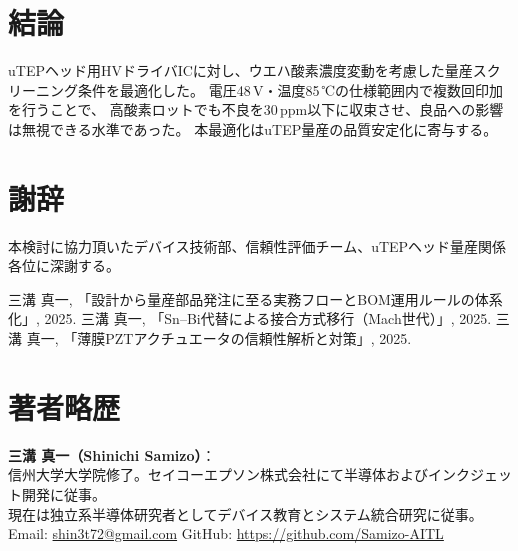 \documentclass[twocolumn]{ieeetran}
\begin{document}
\section{結論}
uTEPヘッド用HVドライバICに対し、ウエハ酸素濃度変動を考慮した量産スクリーニング条件を最適化した。
電圧48\,V・温度85\,℃の仕様範囲内で複数回印加を行うことで、
高酸素ロットでも不良を30\,ppm以下に収束させ、良品への影響は無視できる水準であった。
本最適化はuTEP量産の品質安定化に寄与する。

\section*{謝辞}
本検討に協力頂いたデバイス技術部、信頼性評価チーム、uTEPヘッド量産関係各位に深謝する。

\begin{thebibliography}{99}
三溝 真一, 「設計から量産部品発注に至る実務フローとBOM運用ルールの体系化」, 2025.
三溝 真一, 「Sn–Bi代替による接合方式移行（Mach世代）」, 2025.
三溝 真一, 「薄膜PZTアクチュエータの信頼性解析と対策」, 2025.
\end{thebibliography}

\section*{著者略歴}
\noindent\textbf{三溝 真一（Shinichi Samizo）}：\\
信州大学大学院修了。セイコーエプソン株式会社にて半導体およびインクジェット開発に従事。\\
現在は独立系半導体研究者としてデバイス教育とシステム統合研究に従事。\\
Email: \href{mailto:shin3t72@gmail.com}{shin3t72@gmail.com}\quad
GitHub: \url{https://github.com/Samizo-AITL}
\end{document}
